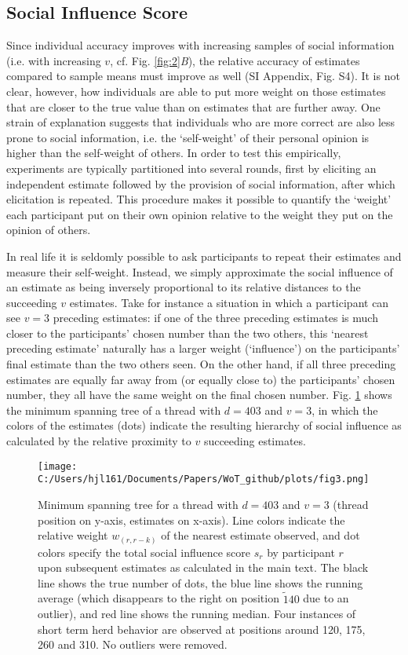 \documentclass[9pt,twocolumn,twoside,lineno]{article}
\begin{document}
\subsection*{Social Influence Score}
Since individual accuracy improves with increasing samples of social information (i.e. with increasing $v$, cf. Fig. \ref{fig:2}\textit{B}), the relative accuracy of estimates compared to sample means must improve as well (SI Appendix, Fig. S4). It is not clear, however, how individuals are able to put more weight on those estimates that are closer to the true value than on estimates that are further away. One strain of explanation \cite{becker2017network, yaniv2004receiving, madirolas2015improving} suggests that individuals who are more correct are also less prone to social information, i.e. the ‘self-weight’ of their personal opinion is higher than the self-weight of others. In order to test this empirically, experiments are typically partitioned into several rounds, first by eliciting an independent estimate followed by the provision of social information, after which elicitation is repeated. This procedure makes it possible to quantify the ‘weight’ each participant put on their own opinion relative to the weight they put on the opinion of others. 

In real life it is seldomly possible to ask participants to repeat their estimates and measure their self-weight. Instead, we simply approximate the social influence of an estimate as being inversely proportional to its relative distances to the succeeding $v$ estimates. Take for instance a situation in which a participant can see $v=3$ preceding estimates: if one of the three preceding estimates is much closer to the participants’ chosen number than the two others, this ‘nearest preceding estimate’ naturally has a larger weight (‘influence’) on the participants' final estimate than the two others seen. On the other hand, if all three preceding estimates are equally far away from (or equally close to) the participants' chosen number, they all have the same weight on the final chosen number. Fig. \ref{fig:3} shows the minimum spanning tree of a thread with $d=403$ and $v=3$, in which the colors of the estimates (dots) indicate the resulting hierarchy of social influence as calculated by the relative proximity to $v$ succeeding estimates.

\begin{figure}%
\centering
\texttt{[image: C:/Users/hjl161/Documents/Papers/WoT\_github/plots/fig3.png]}
\caption{Minimum spanning tree for a thread with $d=403$ and $v=3$ (thread position on y-axis, estimates on x-axis). Line colors indicate the relative weight $w_(r,r-k)$ of the nearest estimate observed, and dot colors specify the total social influence score $s_r$ by participant $r$ upon subsequent estimates as calculated in the main text. The black line shows the true number of dots, the blue line shows the running average (which disappears to the right on position $\tilde 140$ due to an outlier), and red line shows the running median. Four instances of short term herd behavior are observed at positions around 120, 175, 260 and 310. No outliers were removed.}
\label{fig:3}
\end{figure}
\end{document}
